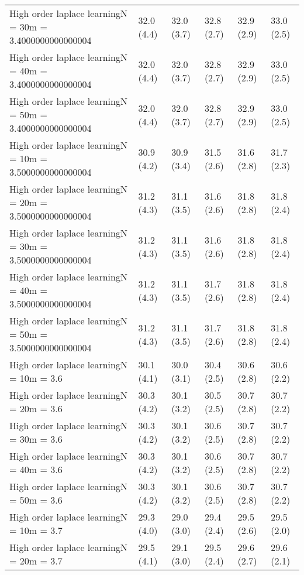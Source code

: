 \documentclass{article}
\begin{document}
\begin{table*}[t!]
\begin{center}
\begin{small}
\begin{sc}
\begin{tabular}{llllll}
High order laplace learningN = 30m = 3.4000000000000004&32.0 (4.4)      &32.0 (3.7)      &32.8 (2.7)      &32.9 (2.9)      &33.0 (2.5)      \\
High order laplace learningN = 40m = 3.4000000000000004&32.0 (4.4)      &32.0 (3.7)      &32.8 (2.7)      &32.9 (2.9)      &33.0 (2.5)      \\
High order laplace learningN = 50m = 3.4000000000000004&32.0 (4.4)      &32.0 (3.7)      &32.8 (2.7)      &32.9 (2.9)      &33.0 (2.5)      \\
High order laplace learningN = 10m = 3.5000000000000004&30.9 (4.2)      &30.9 (3.4)      &31.5 (2.6)      &31.6 (2.8)      &31.7 (2.3)      \\
High order laplace learningN = 20m = 3.5000000000000004&31.2 (4.3)      &31.1 (3.5)      &31.6 (2.6)      &31.8 (2.8)      &31.8 (2.4)      \\
High order laplace learningN = 30m = 3.5000000000000004&31.2 (4.3)      &31.1 (3.5)      &31.6 (2.6)      &31.8 (2.8)      &31.8 (2.4)      \\
High order laplace learningN = 40m = 3.5000000000000004&31.2 (4.3)      &31.1 (3.5)      &31.7 (2.6)      &31.8 (2.8)      &31.8 (2.4)      \\
High order laplace learningN = 50m = 3.5000000000000004&31.2 (4.3)      &31.1 (3.5)      &31.7 (2.6)      &31.8 (2.8)      &31.8 (2.4)      \\
High order laplace learningN = 10m = 3.6&30.1 (4.1)      &30.0 (3.1)      &30.4 (2.5)      &30.6 (2.8)      &30.6 (2.2)      \\
High order laplace learningN = 20m = 3.6&30.3 (4.2)      &30.1 (3.2)      &30.5 (2.5)      &30.7 (2.8)      &30.7 (2.2)      \\
High order laplace learningN = 30m = 3.6&30.3 (4.2)      &30.1 (3.2)      &30.6 (2.5)      &30.7 (2.8)      &30.7 (2.2)      \\
High order laplace learningN = 40m = 3.6&30.3 (4.2)      &30.1 (3.2)      &30.6 (2.5)      &30.7 (2.8)      &30.7 (2.2)      \\
High order laplace learningN = 50m = 3.6&30.3 (4.2)      &30.1 (3.2)      &30.6 (2.5)      &30.7 (2.8)      &30.7 (2.2)      \\
High order laplace learningN = 10m = 3.7&29.3 (4.0)      &29.0 (3.0)      &29.4 (2.4)      &29.5 (2.6)      &29.5 (2.0)      \\
High order laplace learningN = 20m = 3.7&29.5 (4.1)      &29.1 (3.0)      &29.5 (2.4)      &29.6 (2.7)      &29.6 (2.1)      \\

\end{tabular}
\end{sc}
\end{small}
\end{center}
\end{table*}
\end{document}
